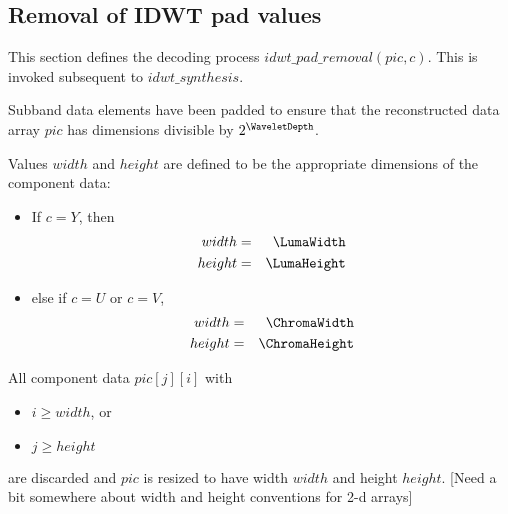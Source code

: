 \clearpage
\subsection{Removal of IDWT pad values}
\label{paddingremoval}

This section defines the decoding process $idwt\_pad\_removal(pic, c)$. This
is invoked subsequent to $idwt\_synthesis$.

Subband data elements have been padded to ensure that the reconstructed 
data array $pic$ has dimensions divisible by $2^\WaveletDepth$.

Values $width$ and $height$ are defined to be the appropriate dimensions
of the component data:

\begin{itemize}
\item If $c=Y$, then
\begin{eqnarray*}
width & =& \LumaWidth \\
height & =& \LumaHeight
\end{eqnarray*}
\item else if $c=U$ or $c=V$,
\begin{eqnarray*}
width & =& \ChromaWidth \\
height & =& \ChromaHeight
\end{eqnarray*}
\end{itemize}

All component data $pic[j][i]$ with

\begin{itemize}
\item $i\geq width$, or
\item $j\geq height$
\end{itemize}

are discarded and $pic$ is resized to have width $width$ and height $height$.
[Need a bit somewhere about width and height conventions for 2-d arrays]